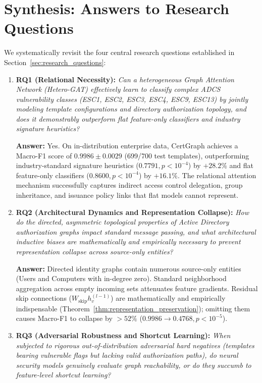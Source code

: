 \section{Synthesis: Answers to Research Questions}
We systematically revisit the four central research questions established in Section~\ref{sec:research_questions}:

\begin{enumerate}
    \item \textbf{RQ1 (Relational Necessity):} \textit{Can a heterogeneous Graph Attention Network (Hetero-GAT) effectively learn to classify complex ADCS vulnerability classes (ESC1, ESC2, ESC3, ESC4, ESC9, ESC13) by jointly modeling template configurations and directory authorization topology, and does it demonstrably outperform flat feature-only classifiers and industry signature heuristics?}
    
    \textbf{Answer:} Yes. On in-distribution enterprise data, CertGraph achieves a Macro-F1 score of $\mathbf{0.9986 \pm 0.0029}$ (699/700 test templates), outperforming industry-standard signature heuristics ($0.7791, p < 10^{-4}$) by $+28.2\%$ and flat feature-only classifiers ($0.8600, p < 10^{-4}$) by $+16.1\%$. The relational attention mechanism successfully captures indirect access control delegation, group inheritance, and issuance policy links that flat models cannot represent.
    
    \item \textbf{RQ2 (Architectural Dynamics and Representation Collapse):} \textit{How do the directed, asymmetric topological properties of Active Directory authorization graphs impact standard message passing, and what architectural inductive biases are mathematically and empirically necessary to prevent representation collapse across source-only entities?}
    
    \textbf{Answer:} Directed identity graphs contain numerous source-only entities (Users and Computers with in-degree zero). Standard neighborhood aggregation across empty incoming sets attenuates feature gradients. Residual skip connections ($W_{\text{skip}} h_v^{(l-1)}$) are mathematically and empirically indispensable (Theorem~\ref{thm:representation_preservation}); omitting them causes Macro-F1 to collapse by $>52\%$ ($0.9986 \to 0.4768, p < 10^{-5}$).
    
    \item \textbf{RQ3 (Adversarial Robustness and Shortcut Learning):} \textit{When subjected to rigorous out-of-distribution adversarial hard negatives (templates bearing vulnerable flags but lacking valid authorization paths), do neural security models genuinely evaluate graph reachability, or do they succumb to feature-level shortcut learning?}
    

\end{enumerate}
